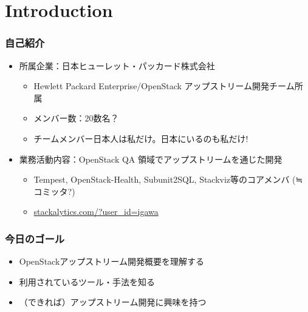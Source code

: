 \documentclass[aspectratio=169,11pt,hyperref={colorlinks=true}]{beamer}
\begin{document}
\section{Introduction}
\begin{frame}
  \frametitle{自己紹介}
  \begin{itemize}
    \item 所属企業：日本ヒューレット・パッカード株式会社
      \begin{itemize}
        \item Hewlett Packard Enterprise/OpenStack アップストリーム開発チーム所属
        \item メンバー数：20数名？
        \item チームメンバー日本人は私だけ。日本にいるのも私だけ!
      \end{itemize}
    \item 業務活動内容：OpenStack QA 領域でアップストリームを通じた開発
      \begin{itemize}
        \item Tempest, OpenStack-Health, Subunit2SQL, Stackviz等のコアメンバ (≒ コミッタ?)
        \item \href{http://stackalytics.com/?user_id=igawa&release=all&metric=all}{stackalytics.com/?user\_id=igawa}
      \end{itemize}
  \end{itemize}
\end{frame}

\begin{frame}
  \frametitle{今日のゴール}
  \begin{itemize}
    \item OpenStackアップストリーム開発概要を理解する
    \item 利用されているツール・手法を知る
    \item （できれば）アップストリーム開発に興味を持つ
  \end{itemize}
\end{frame}
\end{document}
